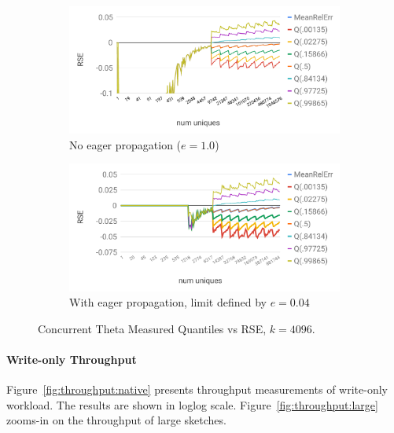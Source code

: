\begin{figure}[tb]
\setlength{\abovecaptionskip}{0pt}
\setlength{\belowcaptionskip}{0pt}
\setlength\textfloatsep{0pt}
\centering
\begin{subfigure}{\columnwidth}\centering
\includegraphics[width=\textwidth]{images/theta-accuracy.pdf}
\caption{No eager propagation ($e=1.0$)}
\label{fig:accuracy}
\end{subfigure}
\begin{subfigure}{\columnwidth}\centering
\includegraphics[width=\textwidth]{images/theta-accuracy-adaptive.pdf}
\caption{With eager propagation, limit defined by $e=0.04$}
\label{fig:accuracy-adaptive}
\end{subfigure}
  \caption{Concurrent Theta Measured Quantiles vs RSE, $k = 4096$.}
  \label{fig:accuracy-res}
\end{figure}

\paragraph{Write-only Throughput}
Figure~\ref{fig:throughput:native} presents throughput measurements of write-only workload. The results are shown in loglog scale.
Figure~\ref{fig:throughput:large} zooms-in on the throughput of large sketches.

